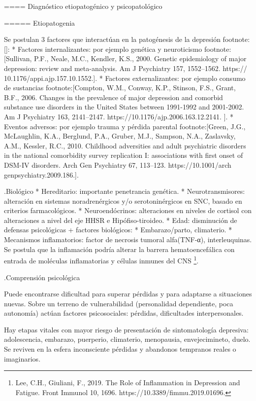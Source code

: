 ==== Diagnóstico etiopatogénico y psicopatológico

===== Etiopatogenia

Se postulan 3 factores que interactúan en la patogénesis de la depresión footnote:[]:
* Factores internalizantes: por ejemplo genética y neuroticismo footnote:[Sullivan, P.F., Neale, M.C., Kendler, K.S., 2000. Genetic epidemiology of major
depression: review and meta-analysis. Am J Psychiatry 157, 1552–1562. https://
10.1176/appi.ajp.157.10.1552.].
* Factores externalizantes: por ejemplo consumo de sustancias footnote:[Compton, W.M., Conway, K.P., Stinson, F.S., Grant, B.F., 2006. Changes in the
prevalence of major depression and comorbid substance use disorders in the United
States between 1991-1992 and 2001-2002. Am J Psychiatry 163, 2141–2147.
https://10.1176/ajp.2006.163.12.2141. ].
* Eventos adversos: por ejemplo trauma y pérdida parental footnote:[Green, J.G., McLaughlin, K.A., Berglund, P.A., Gruber, M.J., Sampson, N.A.,
Zaslavsky, A.M., Kessler, R.C., 2010. Childhood adversities and adult psychiatric
disorders in the national comorbidity survey replication I: associations with first
onset of DSM-IV disorders. Arch Gen Psychiatry 67, 113–123. https://10.1001/arch
genpsychiatry.2009.186.].

.Biológico
* Hereditario: importante penetrancia genética.
* Neurotransmisores: alteración en sistemas noradrenérgicos y/o serotoninérgicos en SNC, basado en criterios farmacológicos.
* Neuroendócrinos: alteraciones en niveles de cortisol con alteraciones a nivel del eje HHSR e Hipófiso-tiroideo.
* Edad: disminución de defensas psicológicas + factores biológicos:
* Embarazo/parto, climaterio.
* Mecanismos inflamatorios: factor de necrosis tumoral alfa(TNF-α), interleuquinas. Se postula que la inflamación podría alterar la barrera hematoencefálica con entrada de moléculas inflamatorias y células inmunes del CNS \footnote{Lee, C.H., Giuliani, F., 2019. The Role of Inflammation in Depression and Fatigue. Front
Immunol 10, 1696. https://10.3389/fimmu.2019.01696.}.

.Comprensión psicológica

Puede encontrarse dificultad para superar pérdidas y para adaptarse a situaciones nuevas. Sobre un terreno de vulnerabilidad (personalidad dependiente, poca autonomía) actúan factores psicosociales: pérdidas, dificultades interpersonales.

Hay etapas vitales con mayor riesgo de presentación de sintomatología depresiva: adolescencia, embarazo, puerperio, climaterio, menopausia, envejecimineto, duelo. Se reviven en la esfera inconsciente pérdidas y abandonos tempranos reales o imaginarios.

